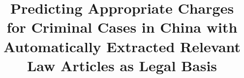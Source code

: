 \documentclass{article}
\title{Predicting Appropriate Charges for Criminal Cases in China with Automatically Extracted Relevant Law Articles as Legal Basis}
\begin{document}
\begin{CJK*}{UTF8}{gbsn}  

\maketitle









\clearpage



\end{CJK*}  
\end{document}
